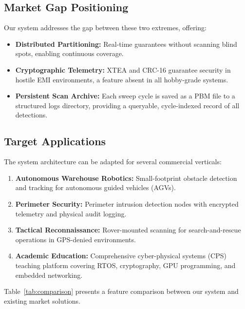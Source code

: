\documentclass[conference]{IEEEtran}
\begin{document}
\subsection{Market Gap Positioning}
Our system addresses the gap between these two extremes, offering:
\begin{itemize}
    \item \textbf{Distributed Partitioning:} Real-time guarantees without scanning blind spots, enabling continuous coverage.
    \item \textbf{Cryptographic Telemetry:} XTEA and CRC-16 guarantee security in hostile EMI environments, a feature absent in all hobby-grade systems.
    \item \textbf{Persistent Scan Archive:} Each sweep cycle is saved as a PBM file to a structured logs directory, providing a queryable, cycle-indexed record of all detections.
\end{itemize}

\subsection{Target Applications}
The system architecture can be adapted for several commercial verticals:
\begin{enumerate}
    \item \textbf{Autonomous Warehouse Robotics:} Small-footprint obstacle detection and tracking for autonomous guided vehicles (AGVs).
    \item \textbf{Perimeter Security:} Perimeter intrusion detection nodes with encrypted telemetry and physical audit logging.
    \item \textbf{Tactical Reconnaissance:} Rover-mounted scanning for search-and-rescue operations in GPS-denied environments.
    \item \textbf{Academic Education:} Comprehensive cyber-physical systems (CPS) teaching platform covering RTOS, cryptography, GPU programming, and embedded networking.
\end{enumerate}

Table~\ref{tab:comparison} presents a feature comparison between our system and existing market solutions.
\end{document}
